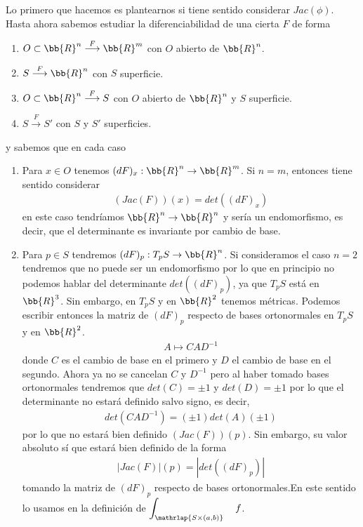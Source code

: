 \begin{observacion}
    Lo primero que hacemos es plantearnos si tiene sentido considerar $Jac(\phi)$. Hasta ahora sabemos estudiar la diferenciabilidad de una cierta $F$ de forma
    \begin{enumerate}
        \item $O \subset \bb{R}^n \overset{F}{\longrightarrow} \bb{R}^m$ con $O$ abierto de $\bb{R}^n$.
        \item $S \overset{F}{\longrightarrow} \bb{R}^n$ con $S$ superficie.
        \item $O \subset \bb{R}^n \overset{F}{\longrightarrow} S$ con $O$ abierto de $\bb{R}^n$ y $S$ superficie.
        \item $S \overset{F}{\longrightarrow} S'$ con $S$ y $S'$ superficies.
    \end{enumerate} 
    y sabemos que en cada caso
    \begin{enumerate}
        \item Para $x\in O$ tenemos $(dF)_x: \bb{R}^n \to \bb{R}^m$. Si $n=m$, entonces tiene sentido considerar
        \begin{gather*}
            (Jac(F))(x) = det((dF)_x)
        \end{gather*}
        en este caso tendríamos $\bb{R}^n \to \bb{R}^n$ y sería un endomorfismo, es decir, que el determinante es invariante por cambio de base.

        \item Para $p\in S$ tendremos $(dF)_p : T_pS \to \bb{R}^n$. Si consideramos el caso $n=2$ tendremos que no puede ser un endomorfismo por lo que en principio no podemos hablar del determinante $det((dF)_p)$, ya que $T_pS$ está en $\bb{R}^3$. Sin embargo, en $T_pS$ y en $\bb{R}^2$ tenemos métricas. Podemos escribir entonces la matriz de $(dF)_p$ respecto de bases ortonormales en $T_pS$ y en $\bb{R}^2$.
        \begin{gather*}
            A \mapsto C A D^{-1}
        \end{gather*}
        donde $C$ es el cambio de base en el primero y $D$ el cambio de base en el segundo. Ahora ya no se cancelan $C$ y $D^{-1}$ pero al haber tomado bases ortonormales tendremos que $det(C)=\pm 1$ y $det(D)=\pm 1$ por lo que el determinante no estará definido salvo signo, es decir,
        \begin{gather*}
            det(CAD^{-1}) = (\pm 1) det(A) (\pm 1)
        \end{gather*}
        por lo que no estará bien definido $(Jac(F))(p)$. Sin embargo, su valor absoluto sí que estará bien definido de la forma
        \begin{gather*}
            |Jac(F)|(p) = |det((dF)_p)|
        \end{gather*}
        tomando la matriz de $(dF)_p$ respecto de bases ortonormales.En este sentido lo usamos en la definición de $\displaystyle\int_{\mathrlap{S\times(a,b)}} \quad f$.
    \end{enumerate}
\end{observacion}

